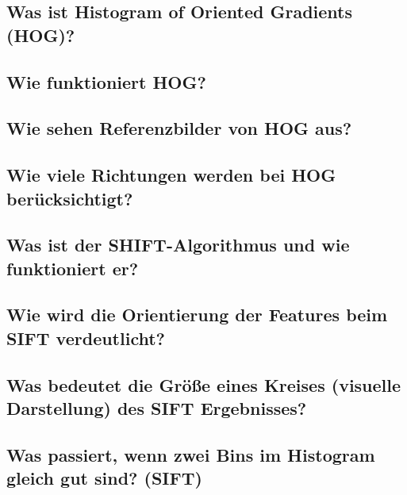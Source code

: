 \subsection{Was ist Histogram of Oriented Gradients (HOG)?}

\subsection{Wie funktioniert HOG?}

\subsection{Wie sehen Referenzbilder von HOG aus?}

\subsection{Wie viele Richtungen werden bei HOG berücksichtigt?}

\subsection{Was ist der SHIFT-Algorithmus und wie funktioniert er?}

\subsection{Wie wird die Orientierung der Features beim SIFT verdeutlicht?}

\subsection{Was bedeutet die Größe eines Kreises (visuelle Darstellung) des SIFT Ergebnisses?}

\subsection{Was passiert, wenn zwei Bins im Histogram gleich gut sind? (SIFT)}
